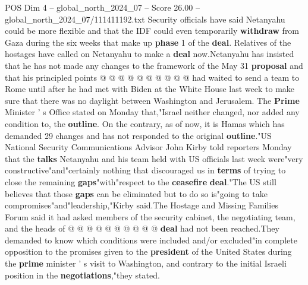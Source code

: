 \begin{textsample}{POS Dim 4 – global\_north\_2024\_07 – Score 26.00 – global\_north\_2024\_07/111411192.txt}
Security officials have said Netanyahu could be more flexible and that the IDF could even temporarily \textbf{withdraw} from Gaza during the six weeks that make up \textbf{phase} 1 of the \textbf{deal}.
Relatives of the hostages have called on Netanyahu to make a \textbf{deal} now.Netanyahu has insisted that he has not made any changes to the framework of the May 31 \textbf{proposal} and that his principled points @ @ @ @ @ @ @ @ @ @ had waited to send a team to Rome until after he had met with Biden at the White House last week to make sure that there was no daylight between Washington and Jerusalem.
The \textbf{Prime} Minister ' s Office stated on Monday that,"Israel neither changed, nor added any condition to, the \textbf{outline}.
On the contrary, as of now, it is Hamas which has demanded 29 changes and has not responded to the original \textbf{outline}."US National Security Communications Advisor John Kirby told reporters Monday that the \textbf{talks} Netanyahu and his team held with US officials last week were"very constructive"and"certainly nothing that discouraged us in \textbf{terms} of trying to close the remaining \textbf{gaps}"with"respect to the \textbf{ceasefire} \textbf{deal}."The US still believes that those \textbf{gaps} can be eliminated but to do so is"going to take compromises"and"leadership,"Kirby said.The Hostage and Missing Families Forum said it had asked members of the security cabinet, the negotiating team, and the heads of @ @ @ @ @ @ @ @ @ @ \textbf{deal} had not been reached.They demanded to know which conditions were included and/or excluded"in complete opposition to the promises given to the \textbf{president} of the United States during the \textbf{prime} minister ' s visit to Washington, and contrary to the initial Israeli position in the \textbf{negotiations},"they stated.

\end{textsample}
